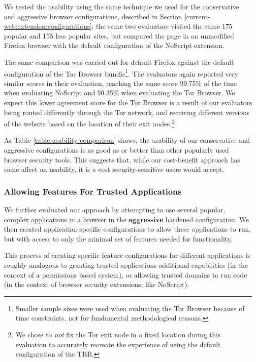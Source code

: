We tested the usability using the same technique we used for the conservative
and aggressive browser configurations, described in Section
\ref{current-web:extension:configurations}; the same two evaluators visited the
same 175 popular and 155 less popular sites, but compared the page in
an unmodified Firefox browser with the default configuration of the NoScript
extension.

The same comparison was carried out for default Firefox against
the default configuration of the Tor Browser bundle\footnote{Smaller sample
sizes were used when evaluating the Tor Browser because of time constraints,
not for fundamental methodological reasons.}.  The evaluators again
reported very similar scores in their evaluation, reaching the same score
99.75\% of the time when evaluating NoScript and 90.35\% when evaluating the
Tor Browser.  We expect this lower agreement score for the Tor Browser is
a result of our evaluators being routed differently through the Tor network, and
receiving different versions of the website based on the location of their
exit nodes.\footnote{We chose to \emph{not} fix the Tor exit node in a fixed
location during this evaluation to accurately recreate the experience of using
the default configuration of the TBB.}

As Table \ref{table:usability-comparison} shows, the usability of our
conservative and aggressive configurations is as good as or better than other
popularly used browser security tools.  This suggests that, while
our \WASs cost-benefit approach has some affect on usability, it is a
cost security-sensitive users would accept.


\subsubsection{Allowing Features For Trusted Applications}
We further evaluated our approach by attempting to use several popular,
complex \JS applications in a browser in the \textbf{aggressive} hardened
configuration.  We then created application-specific configurations to allow
these applications to run, but with access to only the minimal set of
features needed for functionality.

This process of creating specific feature configurations for different
applications is roughly analogous to granting trusted applications additional
capabilities (in the context of a permissions based system), or allowing trusted
domains to run \JS code (in the context of browser security extensions, like
NoScript).

